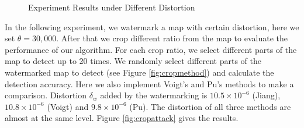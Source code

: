 \begin{figure}[h]
\centering
{}
\caption{Experiment Results under Different Distortion}
\label{fig:pudd}
\end{figure}


In the following experiment, we watermark a map with certain distortion, here we set 
$\theta =30,000$. After that we crop different ratio from the map to evaluate the performance 
of our algorithm. For each crop ratio, we select different parts of the map to detect 
up to 20 times. We randomly select different parts of the watermarked map to detect (see 
Figure \ref{fig:cropmethod}) and calculate the detection accuracy. Here we also implement 
Voigt's and Pu's methods to make a comparison. Distortion $\delta_w$ added by the watermarking 
is $10.5\times 10^{ -6 }$ (Jiang), $10.8\times 10^{-6}$ (Voigt) and $9.8\times 10^{-6}$ (Pu). 
The distortion of all three methods are almost at the same level.
Figure \ref{fig:cropattack} gives the results.



